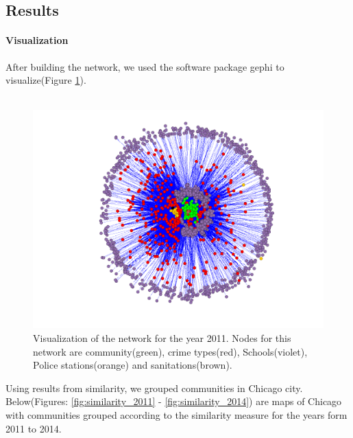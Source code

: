 \documentclass{article}
\begin{document}
\subsection{Results}
\paragraph{Visualization}
After building the network, we used the software package gephi to visualize(Figure \ref{fig:fig1}).\\~\\
\begin{figure}[H]
\centering
	\includegraphics[scale=0.2, trim={0 0.5cm 0 6cm}]{Network_2011_forceAtlas.png}
	\caption{Visualization of the network for the year 2011. Nodes for this network are community(green), crime types(red), Schools(violet), Police stations(orange) and sanitations(brown).}
	\label{fig:fig1}
\end{figure}
Using results from similarity, we grouped communities in Chicago city. Below(Figures: \ref{fig:similarity_2011} - \ref{fig:similarity_2014}) are maps of Chicago with communities grouped according to the similarity measure for the years form 2011 to 2014.
\end{document}
